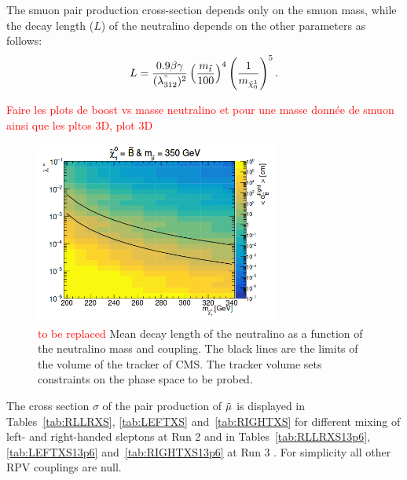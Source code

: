 \documentclass{cernatlasnote}
\begin{document}
The smuon pair production cross-section depends only on the smuon mass, while the decay length ($L$) of the neutralino depends on the other parameters as follows:
$$ L = \frac{0.9 \beta\gamma}{(\lambda^{"}_{312})^2} \left(\frac{m_{\Tilde{t}}}{100}\right)^{4} \left(\frac{1}{m_{\Tilde{\chi}_{0}^{1}}}\right)^5. $$

\textcolor{red}{Faire les plots de boost vs masse neutralino et pour une masse donnée de smuon ainsi que les pltos 3D, plot 3D}

\begin{figure}[ht]
\centering
\includegraphics[height=6cm, width=8cm, trim= 0cm 0cm 0cm 0.cm,clip]{images/PhaseSPace/Meandecaylength.png}
\caption{\label{fig:bgctau} \textcolor{red}{to be replaced} Mean decay length of the neutralino as a function of the neutralino mass and coupling. The black lines are the limits of the volume of the tracker of CMS. The tracker volume sets constraints on the phase space to be probed.}
\end{figure}

The cross section $\sigma$ of the pair production of $\Tilde{\mu}$ is displayed in Tables~\ref{tab:RLLRXS}, \ref{tab:LEFTXS} and~\ref{tab:RIGHTXS} for different mixing of left- and right-handed sleptons at Run 2 and in Tables~\ref{tab:RLLRXS13p6}, \ref{tab:LEFTXS13p6} and~\ref{tab:RIGHTXS13p6} at Run 3 . For simplicity all other RPV couplings are null. 
\end{document}
